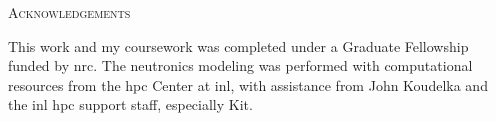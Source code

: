 \begin{center}
   {\LARGE\textsc{Acknowledgements}}

   This work and my coursework was completed under a Graduate Fellowship funded by \acf{nrc}. The neutronics modeling was performed with computational resources from the \acf{hpc} Center at \acf{inl}, with assistance from John Koudelka and the \acs{inl} \acs{hpc} support staff, especially Kit.
   
\end{center}

